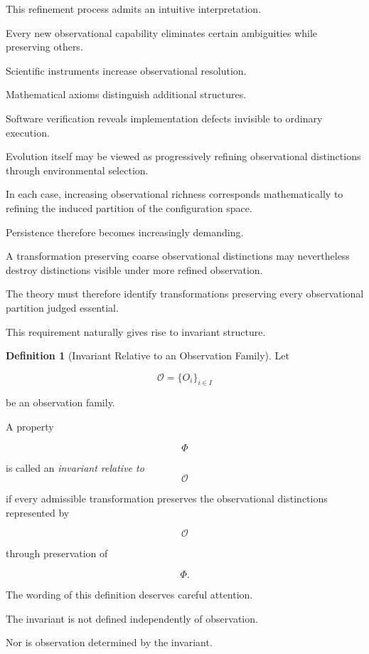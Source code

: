 \documentclass[11pt]{book}
\numberwithin{equation}{chapter}
\theoremstyle{definition}
\newtheorem{definition}{Definition}[chapter]
\theoremstyle{plain}
\begin{document}
This refinement process admits an intuitive interpretation.

Every new observational capability eliminates certain ambiguities while preserving others.

Scientific instruments increase observational resolution.

Mathematical axioms distinguish additional structures.

Software verification reveals implementation defects invisible to ordinary execution.

Evolution itself may be viewed as progressively refining observational distinctions through environmental selection.

In each case, increasing observational richness corresponds mathematically to refining the induced partition of the configuration space.

Persistence therefore becomes increasingly demanding.

A transformation preserving coarse observational distinctions may nevertheless destroy distinctions visible under more refined observation.

The theory must therefore identify transformations preserving every observational partition judged essential.

This requirement naturally gives rise to invariant structure.

\begin{definition}[Invariant Relative to an Observation Family]

Let

\[
\mathcal{O}
=
\{O_i\}_{i\in I}
\]

be an observation family.

A property

\[
\Phi
\]

is called an \emph{invariant relative to}
\[
\mathcal O
\]

if every admissible transformation preserves the observational distinctions represented by

\[
\mathcal O
\]

through preservation of

\[
\Phi.
\]

\end{definition}

The wording of this definition deserves careful attention.

The invariant is not defined independently of observation.

Nor is observation determined by the invariant.
\end{document}

